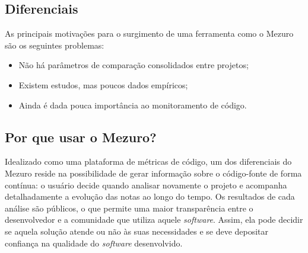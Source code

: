 \documentclass{llncs}
\begin{document}
  \subsection{Diferenciais} \label{subsec:motivacao}
  As principais motivações para o surgimento de uma ferramenta como o Mezuro são os seguintes problemas:
  \begin{itemize}
      \item Não há parâmetros de comparação consolidados entre projetos;
      \item Existem estudos, mas poucos dados empíricos;
      \item Ainda é dada pouca importância ao monitoramento de código.
  \end{itemize}

  \subsection{Por que usar o Mezuro?} \label{sec:projeto-mezuro}
  Idealizado como uma plataforma de métricas de código, um dos diferenciais do Mezuro reside na possibilidade de gerar informação sobre o código-fonte de forma contínua: o usuário decide quando analisar novamente o projeto e acompanha detalhadamente a evolução das notas ao longo do tempo. Os resultados de cada análise são públicos, o que permite uma maior transparência entre o desenvolvedor e a comunidade que utiliza aquele \textit{software}. Assim, ela pode decidir se aquela solução atende ou não às suas necessidades e se deve depositar confiança na qualidade do \textit{software} desenvolvido.
\end{document}
